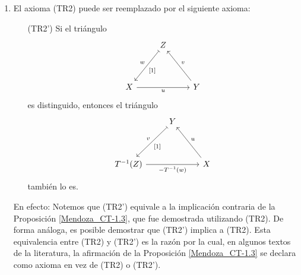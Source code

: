 \documentclass[tesis]{subfiles}
\begin{document}
\begin{Obs}\label{Obs: (TR2)}\leavevmode
    \begin{enumerate}[label=(\arabic*)]
    
        \item El axioma (TR2) puede ser reemplazado por el siguiente axioma:

        \begin{itemize}
            \item[(TR2')] Si el triángulo
                \begin{equation}\label{eq: (TR2)-1}
                    \begin{tikzcd}
                        &Z \arrow[maps to]{ddl}{[1]}[swap]{w} \\ \\
                        X \arrow{rr}[swap]{u} &&Y \arrow{uul}[swap]{v}
                    \end{tikzcd}
                \end{equation}
                es distinguido, entonces el triángulo
                \begin{equation}\label{eq: (TR2)-2}
                    \begin{tikzcd}
                        &Y \arrow[maps to]{ddl}{[1]}[swap]{v} \\ \\
                        T^{-1}(Z) \arrow{rr}[swap]{-T^{-1}(w)} &&X \arrow{uul}[swap]{u}
                    \end{tikzcd}
                \end{equation}
                también lo es.
        \end{itemize}

        En efecto: Notemos que (TR2') equivale a la implicación contraria de la Proposición \ref{Mendoza_CT-1.3}, que fue demostrada utilizando (TR2). De forma análoga, es posible demostrar que (TR2') implica a (TR2). Esta equivalencia entre (TR2) y (TR2') es la razón por la cual, en algunos textos de la literatura, la afirmación de la Proposición \ref{Mendoza_CT-1.3} se declara como axioma en vez de (TR2) o (TR2'). 


\end{enumerate}
\end{Obs}
\end{document}
